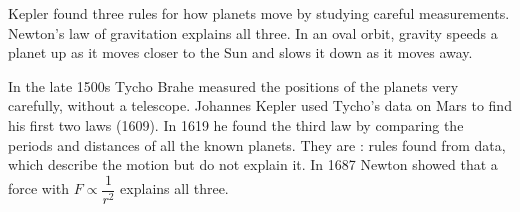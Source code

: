 \begin{bigidea}
Kepler found three rules for how planets move by studying careful measurements. Newton's law of
gravitation explains all three. In an oval orbit, gravity speeds a planet up as it moves closer
to the Sun and slows it down as it moves away.
\end{bigidea}

\begin{keywords}
\end{keywords}

In the late 1500s Tycho Brahe measured the positions of the planets very carefully, without a
telescope. Johannes Kepler used Tycho's data on Mars to find his first two laws (1609). In 1619
he found the third law by comparing the periods and distances of all the known planets. They are
: rules found from data, which describe the motion but do not explain it. In
1687 Newton showed that a force with $F \propto \dfrac{1}{r^2}$ explains all three.

